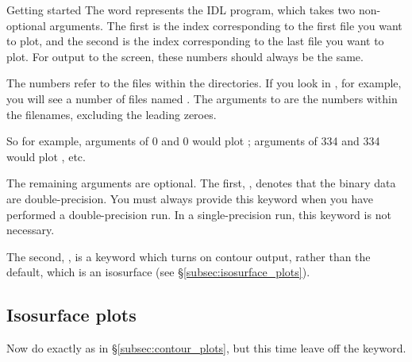 \begin{chapter}{\label{cha:quickstart}Getting started}
  The word  represents the IDL program, which takes two
  non-optional arguments.  The first is the index corresponding to the first
  file you want to plot, and the second is the index corresponding to the last
  file you want to plot.  For output to the screen, these numbers should always
  be the same.

  The numbers refer to the files within the  directories.  If you
  look in , for example, you will see a number of files named
  .  The arguments to  are the numbers
  within the filenames, excluding the leading zeroes.

  So for example, arguments of 0 and 0 would plot ;
  arguments of 334 and 334 would plot , etc.

  The remaining arguments are optional.  The first, , denotes that
  the binary data are double-precision.  You must always provide this keyword
  when you have performed a double-precision run.  In a single-precision run,
  this keyword is not necessary.

  The second, , is a keyword which turns on contour output,
  rather than the default, which is an isosurface (see
  \S\ref{subsec:isosurface_plots}).

  \subsection{\label{subsec:isosurface_plots}Isosurface plots}
  Now do exactly as in \S\ref{subsec:contour_plots}, but this time leave off
  the  keyword.
  

\end{chapter}
